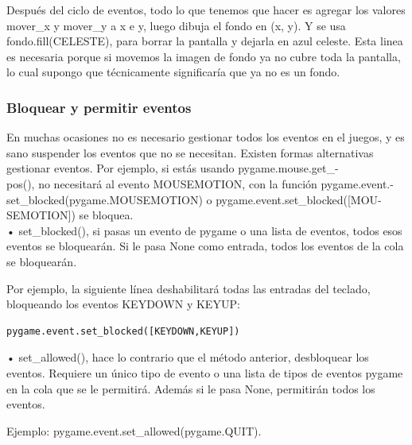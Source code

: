 Después del ciclo de eventos, todo lo que tenemos que hacer es agregar los valores {\ttfamily mover\_x} y 
{\ttfamily mover\_y} a x e y, luego dibuja el fondo en (x, y). Y se usa  {\ttfamily fondo.fill(CELESTE)},
 para borrar la pantalla y dejarla en azul celeste. Esta linea es necesaria porque si movemos la imagen de fondo ya no cubre toda la pantalla, lo cual supongo que técnicamente significaría que ya no es un fondo.


\subsubsection{Bloquear y permitir eventos}  %

En muchas ocasiones no  es necesario gestionar todos los eventos en el juegos, y es sano suspender los eventos que no se necesitan.
Existen formas alternativas  gestionar eventos. Por ejemplo, si estás usando {\ttfamily pygame.mouse.get\_-\\pos()}, no necesitará  al evento {\ttfamily MOUSEMOTION}, con la función {\ttfamily pygame.event.-\\set\_blocked(pygame.MOUSEMOTION)} o 
 {\ttfamily pygame.event.set\_blocked([MOU-\\SEMOTION])} se bloquea. \\

• {\ttfamily set\_blocked()}, si pasas un evento de pygame o una lista de eventos, todos esos eventos se bloquearán.  Si le pasa {\ttfamily None} como entrada, todos los eventos de la cola se bloquearán.

Por ejemplo, la siguiente línea deshabilitará todas las entradas del teclado, bloqueando los eventos 
{\ttfamily KEYDOWN} y  {\ttfamily KEYUP}:
\begin{lstlisting}		
pygame.event.set_blocked([KEYDOWN,KEYUP])
\end{lstlisting}

•  {\ttfamily set\_allowed()}, hace lo contrario que el método anterior,  desbloquear los eventos.  Requiere un único tipo de evento o una lista de tipos de eventos pygame en la cola que se le permitirá.  Además  si le pasa {\ttfamily None}, permitirán todos los eventos. 

\noindent Ejemplo:  {\ttfamily pygame.event.set\_allowed(pygame.QUIT)}.\\
 
